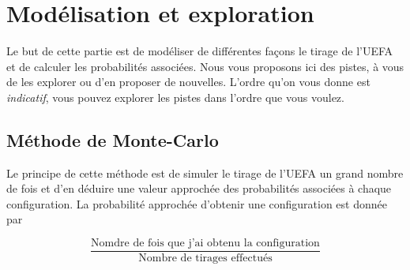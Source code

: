\documentclass{../ficheTDTP}
\begin{document}
\section{Modélisation et exploration}

Le but de cette partie est de modéliser de différentes façons le tirage de l'UEFA et de calculer les probabilités associées. Nous vous proposons ici des pistes, à vous de les explorer ou d'en proposer de nouvelles. L'ordre qu'on vous donne est \textit{indicatif}, vous pouvez explorer les pistes dans l'ordre que vous voulez. 

\subsection{Méthode de Monte-Carlo}

Le principe de cette méthode est de simuler le tirage de l'UEFA un grand nombre de fois et d'en déduire une valeur approchée des probabilités associées à chaque configuration. La probabilité approchée d'obtenir une configuration est donnée par 

\begin{equation*}
\frac{\text{Nomdre de fois que j'ai obtenu la configuration}}{\text{Nombre de tirages effectués}}
\end{equation*}
\end{document}
